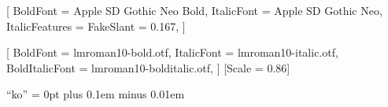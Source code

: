 %

\usepackage{fontspec}
\usepackage{xeCJK}


[
  BoldFont       = {Apple SD Gothic Neo Bold},
  ItalicFont     = {Apple SD Gothic Neo},
  ItalicFeatures = {FakeSlant = 0.167},
]

\setmainfont{lmroman10-regular.otf}[
  BoldFont       = lmroman10-bold.otf,
  ItalicFont     = lmroman10-italic.otf,
  BoldItalicFont = lmroman10-bolditalic.otf,
]
\setmonofont{Menlo}[Scale = 0.86]

\XeTeXlinebreaklocale ``ko''
\XeTeXlinebreakskip = 0pt plus 0.1em minus 0.01em

\usepackage{amsmath}
\usepackage{amssymb}
\usepackage{amsthm}

\usepackage{graphicx}
\usepackage{booktabs}
\usepackage{tabularx}
\usepackage{array}
\usepackage[font=small, labelfont=bf]{caption}
\usepackage{subcaption}
\usepackage{listings}
\usepackage{tikz}
\usetikzlibrary{arrows.meta, positioning, fit, backgrounds, calc}
\usepackage{figkit}
\renewcommand{\flowaltname}{기준선}
\renewcommand{\flownewname}{바뀐 단계}

\usepackage[a4paper, margin=2.6cm, headheight=14pt]{geometry}
\usepackage{fancyhdr}
\usepackage{titlesec}
\usepackage{enumitem}
\usepackage{xcolor}
\usepackage{microtype}

